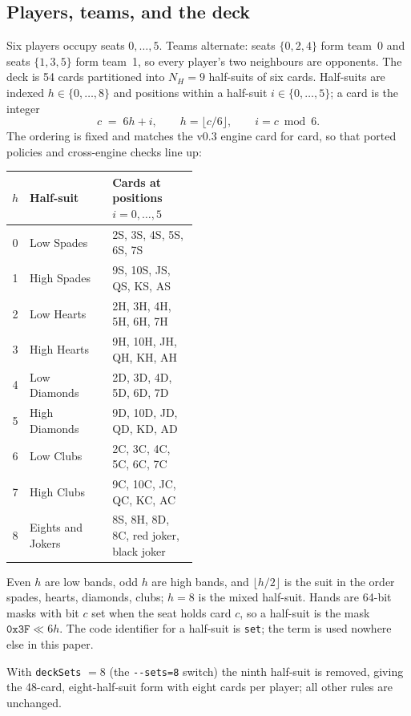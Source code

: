 \documentclass[11pt]{article}
\theoremstyle{definition}
\begin{document}
\subsection{Players, teams, and the deck}

Six players occupy seats $0,\dots,5$. Teams alternate: seats $\{0,2,4\}$ form
team~0 and seats $\{1,3,5\}$ form team~1, so every player's two neighbours are
opponents. The deck is 54 cards partitioned into $N_H = 9$ half-suits of six
cards. Half-suits are indexed $h \in \{0,\dots,8\}$ and positions within a
half-suit $i \in \{0,\dots,5\}$; a card is the integer
\[
  c \;=\; 6h + i, \qquad h = \lfloor c/6 \rfloor, \qquad i = c \bmod 6 .
\]
The ordering is fixed and matches the v0.3 engine card for card, so that ported
policies and cross-engine checks line up:

\begin{center}
\small
\begin{tabular}{@{}clp{0.46\linewidth}@{}}
\toprule
$h$ & Half-suit & Cards at positions $i = 0,\dots,5$ \\
\midrule
0 & Low Spades    & 2S, 3S, 4S, 5S, 6S, 7S \\
1 & High Spades   & 9S, 10S, JS, QS, KS, AS \\
2 & Low Hearts    & 2H, 3H, 4H, 5H, 6H, 7H \\
3 & High Hearts   & 9H, 10H, JH, QH, KH, AH \\
4 & Low Diamonds  & 2D, 3D, 4D, 5D, 6D, 7D \\
5 & High Diamonds & 9D, 10D, JD, QD, KD, AD \\
6 & Low Clubs     & 2C, 3C, 4C, 5C, 6C, 7C \\
7 & High Clubs    & 9C, 10C, JC, QC, KC, AC \\
8 & Eights and Jokers & 8S, 8H, 8D, 8C, red joker, black joker \\
\bottomrule
\end{tabular}
\end{center}

Even $h$ are low bands, odd $h$ are high bands, and $\lfloor h/2 \rfloor$ is the
suit in the order spades, hearts, diamonds, clubs; $h = 8$ is the mixed
half-suit. Hands are 64-bit masks with bit $c$ set when the seat holds card $c$,
so a half-suit is the mask $\mathtt{0x3F} \ll 6h$. The code identifier for a
half-suit is \texttt{set}; the term is used nowhere else in this paper.

With \texttt{deckSets} $=8$ (the \texttt{-{}-sets=8} switch) the ninth half-suit
is removed, giving the 48-card, eight-half-suit form with eight cards per
player; all other rules are unchanged.
\end{document}
